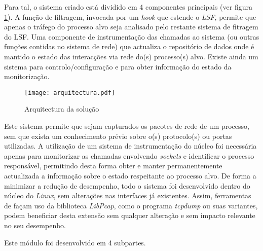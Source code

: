 Para tal, o sistema criado está dividido em 4 componentes principais (ver figura \ref{arquitectura}).
A função de filtragem, invocada por um \textit{hook} que estende o \textit{LSF}, permite que apenas o tráfego do processo alvo seja analisado pelo restante sistema de fitragem do LSF.
Uma componente de instrumentação das chamadas ao sistema (ou outras funções contidas no sistema de rede) que actualiza o repositório de dados onde é mantido o estado das interacções via rede do(s) processo(s) alvo.
Existe ainda um sistema para controlo/configuração e para obter informação do estado da monitorização.

\begin{figure}[htbp]
\begin{center}
\texttt{[image: arquitectura.pdf]} 
\caption{Arquitectura da solução}
\label{arquitectura}
\end{center}
\end{figure}

Este sistema permite que sejam capturados os pacotes de rede de um processo, sem que exista um conhecimento prévio sobre o(s) protocolo(s) ou portas utilizadas.
 A utilização de um sistema de instrumentação do núcleo foi necessária apenas para monitorizar as chamadas envolvendo \emph{sockets} e identificar o processo responsável, permitindo desta forma obter e manter permanentemente actualizada a informação sobre o estado respeitante ao processo alvo.
 De forma a minimizar a redução de desempenho, todo o sistema foi desenvolvido dentro do núcleo do \textit{Linux}, sem alterações nas interfaces já existentes.
 Assim, ferramentas de façam uso da biblioteca \textit{LibPcap}, como o programa \textit{tcpdump} ou suas variantes, podem beneficiar desta extensão sem qualquer alteração e sem impacto relevante no seu desempenho.



Este módulo foi desenvolvido em 4 subpartes. 

